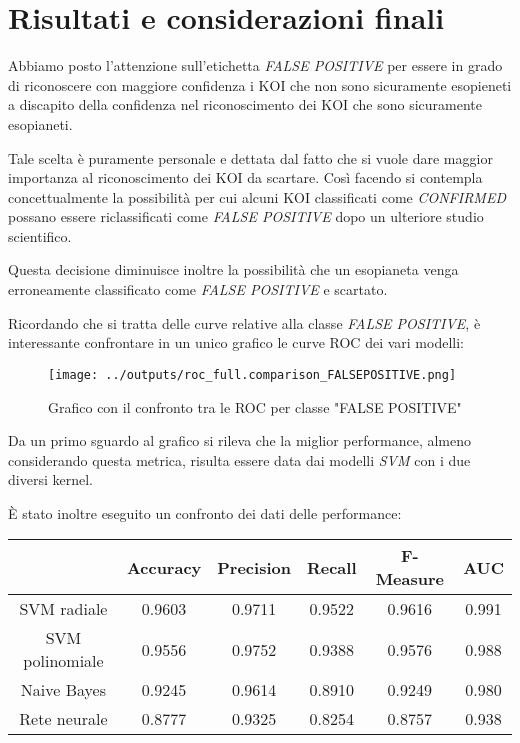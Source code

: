 \chapter{Risultati e considerazioni finali}
Abbiamo posto l'attenzione sull'etichetta \textit{FALSE POSITIVE}
per essere in grado di riconoscere con maggiore confidenza i KOI che 
non sono sicuramente esopieneti a discapito della confidenza nel 
riconoscimento dei KOI che sono sicuramente esopianeti. 

Tale scelta è puramente personale e dettata dal fatto che si 
vuole dare maggior importanza al riconoscimento dei KOI da scartare.
Così facendo si contempla concettualmente la possibilità per cui alcuni 
KOI classificati come \textit{CONFIRMED} possano essere riclassificati come 
\textit{FALSE POSITIVE} dopo un ulteriore studio scientifico.

Questa decisione diminuisce inoltre la possibilità che un esopianeta 
venga erroneamente classificato come \textit{FALSE POSITIVE} e scartato.

Ricordando che si tratta delle curve relative alla classe 
\textit{FALSE POSITIVE}, è interessante confrontare in un unico grafico le curve ROC dei 
vari modelli:
\begin{figure}[H]
    \centering
    \texttt{[image: ../outputs/roc\_full.comparison\_FALSEPOSITIVE.png]}
    \caption{Grafico con il confronto tra le ROC per classe "FALSE POSITIVE"}
\end{figure}

Da un primo sguardo al grafico si rileva che la miglior performance, almeno 
considerando questa metrica, risulta essere data dai modelli \textit{SVM} con
i due diversi kernel.

È stato inoltre eseguito un confronto dei dati delle performance:
\begin{table}[H]
    \centering
    \begin{tabular}{|c|c|c|c|c|c|}
        \hline
         & Accuracy  & Precision & Recall & F-Measure & AUC \\
        \hline
        \hline
        SVM radiale & 0.9603 & 0.9711 & 0.9522 & 0.9616 & 0.991 \\
        SVM polinomiale & 0.9556 & 0.9752 & 0.9388 & 0.9576 & 0.988 \\
        Naive Bayes & 0.9245 & 0.9614 & 0.8910 & 0.9249 & 0.980 \\
        Rete neurale & 0.8777 & 0.9325 & 0.8254 & 0.8757 & 0.938 \\
        \hline
    \end{tabular}
\end{table}

